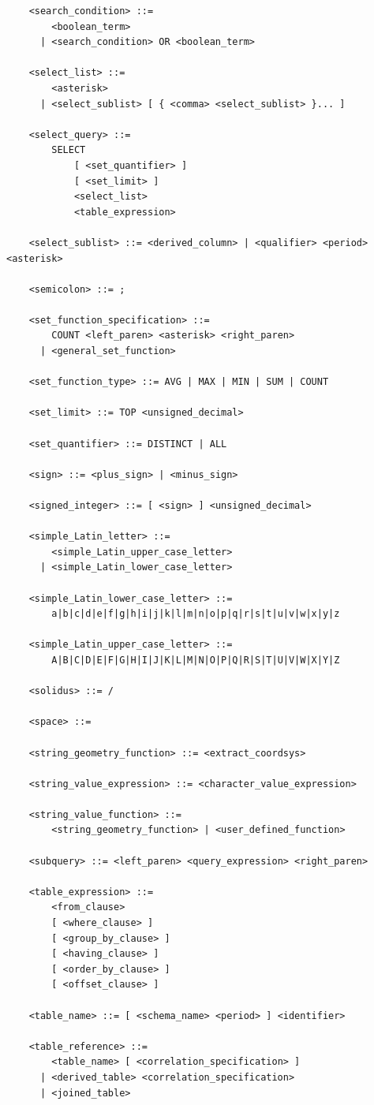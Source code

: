 \documentclass[11pt,a4paper]{ivoa}
\begin{document}
\begin{verbatim}
    <search_condition> ::=
        <boolean_term>
      | <search_condition> OR <boolean_term>

    <select_list> ::=
        <asterisk>
      | <select_sublist> [ { <comma> <select_sublist> }... ]

    <select_query> ::=
        SELECT
            [ <set_quantifier> ]
            [ <set_limit> ]
            <select_list>
            <table_expression>

    <select_sublist> ::= <derived_column> | <qualifier> <period> <asterisk>

    <semicolon> ::= ;

    <set_function_specification> ::=
        COUNT <left_paren> <asterisk> <right_paren>
      | <general_set_function>

    <set_function_type> ::= AVG | MAX | MIN | SUM | COUNT

    <set_limit> ::= TOP <unsigned_decimal>

    <set_quantifier> ::= DISTINCT | ALL

    <sign> ::= <plus_sign> | <minus_sign>

    <signed_integer> ::= [ <sign> ] <unsigned_decimal>

    <simple_Latin_letter> ::=
        <simple_Latin_upper_case_letter>
      | <simple_Latin_lower_case_letter>

    <simple_Latin_lower_case_letter> ::=
        a|b|c|d|e|f|g|h|i|j|k|l|m|n|o|p|q|r|s|t|u|v|w|x|y|z

    <simple_Latin_upper_case_letter> ::=
        A|B|C|D|E|F|G|H|I|J|K|L|M|N|O|P|Q|R|S|T|U|V|W|X|Y|Z

    <solidus> ::= /

    <space> ::=

    <string_geometry_function> ::= <extract_coordsys>

    <string_value_expression> ::= <character_value_expression>

    <string_value_function> ::=
        <string_geometry_function> | <user_defined_function>

    <subquery> ::= <left_paren> <query_expression> <right_paren>

    <table_expression> ::=
        <from_clause>
        [ <where_clause> ]
        [ <group_by_clause> ]
        [ <having_clause> ]
        [ <order_by_clause> ]
        [ <offset_clause> ]

    <table_name> ::= [ <schema_name> <period> ] <identifier>

    <table_reference> ::=
        <table_name> [ <correlation_specification> ]
      | <derived_table> <correlation_specification>
      | <joined_table>


\end{verbatim}
\end{document}
